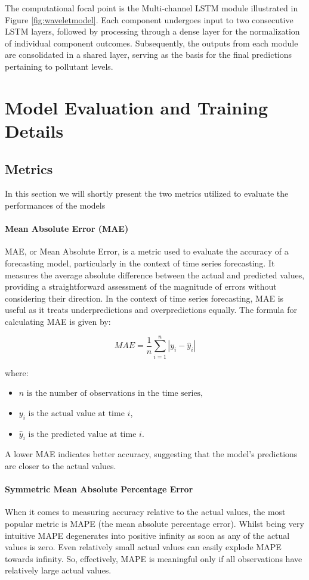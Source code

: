 The computational focal point is the Multi-channel LSTM module illustrated in Figure \ref{fig:waveletmodel}. Each component undergoes input to two consecutive LSTM layers, followed by processing through a dense layer for the normalization of individual component outcomes. Subsequently, the outputs from each module are consolidated in a shared layer, serving as the basis for the final predictions pertaining to pollutant levels.

\section{Model Evaluation and Training Details}

\subsection{Metrics}

In this section we will shortly present the two metrics utilized to evaluate the performances of the models

\paragraph{Mean Absolute Error (MAE)}
MAE, or Mean Absolute Error, is a metric used to evaluate the accuracy of a forecasting model, particularly in the context of time series forecasting. It measures the average absolute difference between the actual and predicted values, providing a straightforward assessment of the magnitude of errors without considering their direction. In the context of time series forecasting, MAE is useful as it treats underpredictions and overpredictions equally. The formula for calculating MAE is given by:

\[
MAE = \frac{1}{n} \sum_{i=1}^{n} |y_i - \hat{y}_i|
\]

where:
\begin{itemize}[noitemsep, leftmargin=*]
\item[] $n \text{ is the number of observations in the time series,}$
\item[] $y_i \text{ is the actual value at time } i$, 
\item[] $\hat{y}_i \text{ is the predicted value at time } i$.
\end{itemize}

A lower MAE indicates better accuracy, suggesting that the model's predictions are closer to the actual values.

\paragraph{Symmetric Mean Absolute Percentage Error}
When it comes to measuring accuracy relative to the actual values, the most
popular metric is MAPE (the mean absolute percentage error). Whilst being very intuitive MAPE degenerates into positive infinity as soon as any of the actual values is zero. Even relatively small actual values can easily explode MAPE towards infinity. So, effectively, MAPE is meaningful only if all observations have relatively large actual values. 

